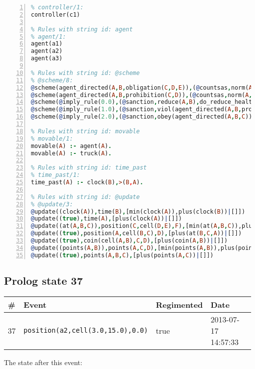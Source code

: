 \documentclass[11pt]{article}\usepackage[utf8]{inputenc}\usepackage{geometry}
\begin{document}
\begin{lstlisting}[language=Prolog, numbers=left]
% Rules with string id: controller
% controller/1:
controller(c1)

% Rules with string id: agent
% agent/1:
agent(a1)
agent(a2)
agent(a3)

% Rules with string id: @scheme
% @scheme/8:
@scheme(agent_directed(A,B,obligation(C,D,E)),(@countsas,norm(A,B,F,obligation(C,D,E)),F),false,(listTrue(C)),(time_past(D)),false,[plus(viol(agent_directed(A,B,obligation(C,D,E))))|[]],[plus(obey(agent_directed(A,B,obligation(C,D,E))))|[]])
@scheme(agent_directed(A,B,prohibition(C,D)),(@countsas,norm(A,B,E,prohibition(C,D)),E),(listTrue(C)),false,(false),false,[plus(viol(agent_directed(A,B,prohibition(C,D))))|[]],[plus(obey(agent_directed(A,B,prohibition(C,D))))|[]])
@scheme(@imply_rule(0.0),(@sanction,reduce(A,B),do_reduce_health(A,B),notifyAgent(A,changed(status))),true,false,false,false,[min(reduce(A,B))|[]],[])
@scheme(@imply_rule(1.0),(@sanction,viol(agent_directed(A,B,prohibition(C,D))),do_sanction(D)),true,false,false,false,[min(viol(agent_directed(A,B,prohibition(C,D))))|[]],[])
@scheme(@imply_rule(2.0),(@sanction,obey(agent_directed(A,B,C))),true,false,false,false,[min(obey(agent_directed(A,B,C)))|[]],[])

% Rules with string id: movable
% movable/1:
movable(A) :- agent(A).
movable(A) :- truck(A).

% Rules with string id: time_past
% time_past/1:
time_past(A) :- clock(B),>(B,A).

% Rules with string id: @update
% @update/3:
@update((clock(A)),time(B),[min(clock(A)),plus(clock(B))|[]])
@update((true),time(A),[plus(clock(A))|[]])
@update((at(A,B,C)),position(C,cell(D,E),F),[min(at(A,B,C)),plus(at(D,E,C))|[]])
@update((true),position(A,cell(B,C),D),[plus(at(B,C,A))|[]])
@update((true),coin(cell(A,B),C,D),[plus(coin(A,B))|[]])
@update((points(A,B)),points(A,C,D),[min(points(A,B)),plus(points(A,D))|[]])
@update((true),points(A,B,C),[plus(points(A,C))|[]])

\end{lstlisting}
\clearpage 
\subsection{Prolog state 37}
\begin{table}[ht]
\centering 
\begin{tabular}{l l l l} 
\textbf{\#} & \textbf{Event} & \textbf{Regimented} & \textbf{Date} \\ [0.5ex] 
\hline
37&\texttt{position(a2,cell(3.0,15.0),0.0)}&true&2013-07-17 14:57:33\\ [1ex] \hline\end{tabular}
\end{table}
The state after this event:
\end{document}

